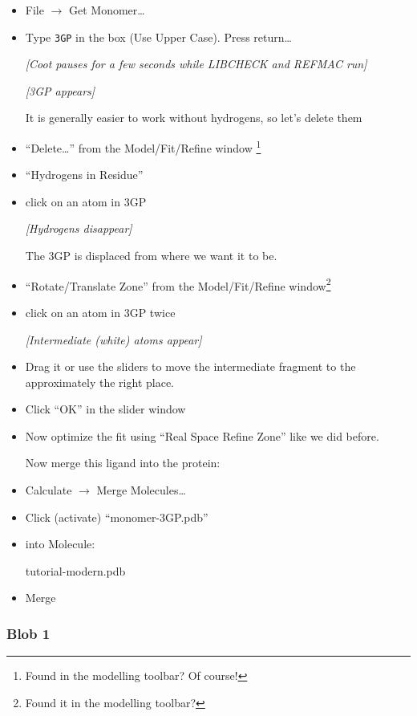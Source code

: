\documentclass{article}
\begin{document}
\begin{itemize}
\item \textsf{File $\rightarrow$ Get Monomer\ldots}
\item Type \texttt{3GP} in the box (Use Upper Case).  Press return\ldots

\textsl{ [Coot pauses for a few seconds while LIBCHECK and REFMAC run]}

\textsl{ [3GP appears]}

It is generally easier to work without hydrogens, so let's delete
them

\item \textsf{``Delete\ldots''} from the Model/Fit/Refine window
  \footnote{Found in the modelling toolbar? Of course!}
\item \textsf{``Hydrogens in Residue''}
\item click on an atom in 3GP

\textsl{ [Hydrogens disappear]}

The 3GP is displaced from where we want it to be.

\item \textsf{``Rotate/Translate Zone''} from the Model/Fit/Refine
  window\footnote{Found it in the modelling toolbar?}
\item click on an atom in 3GP twice

\textsl{ [Intermediate (white) atoms appear]}

\item Drag it or use the sliders to move the intermediate fragment to
  the approximately the right place.
\item Click \textsf{``OK''} in the slider window
\item Now optimize the fit using ``Real Space Refine Zone'' like we did
  before.

Now merge this ligand into the protein:
\item \textsf{Calculate $\rightarrow$ Merge Molecules\ldots}
\item Click (activate) ``monomer-3GP.pdb''
\item into Molecule:
  
  \textsf{tutorial-modern.pdb}

\item \textsf{Merge}

\end{itemize}

\subsubsection{Blob 1}
\end{document}
